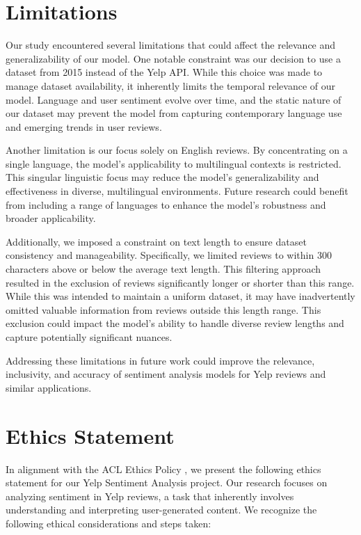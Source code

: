 \documentclass[12pt]{article}
\begin{document}
\section*{Limitations}
Our study encountered several limitations that could affect the relevance and generalizability of our model. One notable constraint was our decision to use a dataset from 2015 instead of the Yelp API. While this choice was made to manage dataset availability, it inherently limits the temporal relevance of our model. Language and user sentiment evolve over time, and the static nature of our dataset may prevent the model from capturing contemporary language use and emerging trends in user reviews.

Another limitation is our focus solely on English reviews. By concentrating on a single language, the model’s applicability to multilingual contexts is restricted. This singular linguistic focus may reduce the model's generalizability and effectiveness in diverse, multilingual environments. Future research could benefit from including a range of languages to enhance the model's robustness and broader applicability.

Additionally, we imposed a constraint on text length to ensure dataset consistency and manageability. Specifically, we limited reviews to within 300 characters above or below the average text length. This filtering approach resulted in the exclusion of reviews significantly longer or shorter than this range. While this was intended to maintain a uniform dataset, it may have inadvertently omitted valuable information from reviews outside this length range. This exclusion could impact the model’s ability to handle diverse review lengths and capture potentially significant nuances.

Addressing these limitations in future work could improve the relevance, inclusivity, and accuracy of sentiment analysis models for Yelp reviews and similar applications.

\section*{Ethics Statement}

In alignment with the ACL Ethics Policy \citep{acl2023ethics}, we present the following ethics statement for our Yelp Sentiment Analysis project. Our research focuses on analyzing sentiment in Yelp reviews, a task that inherently involves understanding and interpreting user-generated content. We recognize the following ethical considerations and steps taken:
\end{document}
